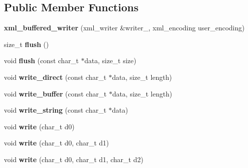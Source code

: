 \subsection*{Public Member Functions}
\begin{DoxyCompactItemize}
\item 
\mbox{\label{classxml__buffered__writer_a3c22ad246e2aebb6597935baf4a223a7}} 
{\bfseries xml\+\_\+buffered\+\_\+writer} (xml\+\_\+writer \&writer\+\_\+, xml\+\_\+encoding user\+\_\+encoding)
\item 
\mbox{\label{classxml__buffered__writer_a4789b8661f9ff4e5e4bb4226f7d45997}} 
size\+\_\+t {\bfseries flush} ()
\item 
\mbox{\label{classxml__buffered__writer_aa733cb2cd0d5fcacec92c67a7f26c553}} 
void {\bfseries flush} (const char\+\_\+t $\ast$data, size\+\_\+t size)
\item 
\mbox{\label{classxml__buffered__writer_a119f9db2f60e578e69ac81177e932fb3}} 
void {\bfseries write\+\_\+direct} (const char\+\_\+t $\ast$data, size\+\_\+t length)
\item 
\mbox{\label{classxml__buffered__writer_ae62b84beff660555acb76e277f967c0d}} 
void {\bfseries write\+\_\+buffer} (const char\+\_\+t $\ast$data, size\+\_\+t length)
\item 
\mbox{\label{classxml__buffered__writer_a1699556c38e942f7c1db1b98ddf15642}} 
void {\bfseries write\+\_\+string} (const char\+\_\+t $\ast$data)
\item 
\mbox{\label{classxml__buffered__writer_a1aa829bd551a69dd9005d2d46063308f}} 
void {\bfseries write} (char\+\_\+t d0)
\item 
\mbox{\label{classxml__buffered__writer_a4cd6e908908e17c9b07eba34f7317791}} 
void {\bfseries write} (char\+\_\+t d0, char\+\_\+t d1)
\item 
\mbox{\label{classxml__buffered__writer_af82b277c1ef5c75d1901bb5a8eb4507f}} 
void {\bfseries write} (char\+\_\+t d0, char\+\_\+t d1, char\+\_\+t d2)

\end{DoxyCompactItemize}
